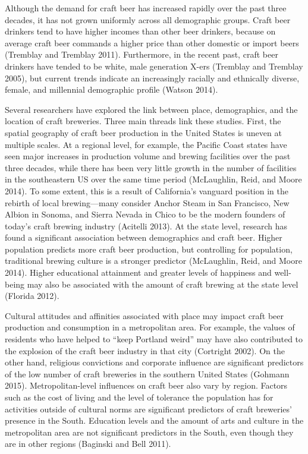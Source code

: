 \documentclass[]{article}
\begin{document}
Although the demand for craft beer has increased rapidly over the past
three decades, it has not grown uniformly across all demographic groups.
Craft beer drinkers tend to have higher incomes than other beer
drinkers, because on average craft beer commands a higher price than
other domestic or import beers (Tremblay and Tremblay 2011).
Furthermore, in the recent past, craft beer drinkers have tended to be
white, male generation X-ers (Tremblay and Tremblay 2005), but current
trends indicate an increasingly racially and ethnically diverse, female,
and millennial demographic profile (Watson 2014).

Several researchers have explored the link between place, demographics,
and the location of craft breweries. Three main threads link these
studies. First, the spatial geography of craft beer production in the
United States is uneven at multiple scales. At a regional level, for
example, the Pacific Coast states have seen major increases in
production volume and brewing facilities over the past three decades,
while there has been very little growth in the number of facilities in
the southeastern US over the same time period (McLaughlin, Reid, and
Moore 2014). To some extent, this is a result of California's vanguard
position in the rebirth of local brewing---many consider Anchor Steam in
San Francisco, New Albion in Sonoma, and Sierra Nevada in Chico to be
the modern founders of today's craft brewing industry (Acitelli 2013).
At the state level, research has found a significant association between
demographics and craft beer. Higher population predicts more craft beer
production, but controlling for population, traditional brewing culture
is a stronger predictor (McLaughlin, Reid, and Moore
201\protect\hypertarget{move422762242}{}{}4). Higher educational
attainment and greater levels of happiness and well-being may also be
associated with the amount of craft brewing at the state level (Florida
2012).

Cultural attitudes and affinities associated with place may impact craft
beer production and consumption in a metropolitan area. For example, the
values of residents who have helped to ``keep Portland weird'' may have
also contributed to the explosion of the craft beer industry in that
city (Cortright 2002). On the other hand, religious convictions and
corporate influence are significant predictors of the low number of
craft breweries in the southern United States (Gohmann 2015).
Metropolitan-level influences on craft beer also vary by region. Factors
such as the cost of living and the level of tolerance the population has
for activities outside of cultural norms are significant predictors of
craft breweries' presence in the South. Education levels and the amount
of arts and culture in the metropolitan area are not significant
predictors in the South, even though they are in other regions (Baginski
and Bell 2011).
\end{document}
